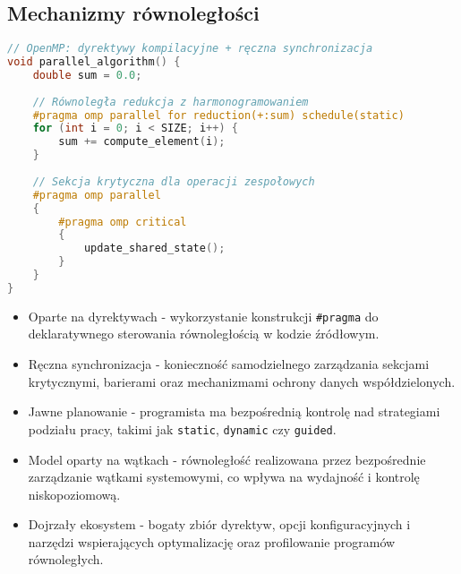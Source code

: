 \subsection{Mechanizmy równoległości}
\begin{lstlisting}[language=C++, style=VS2017,  caption={Mechanizmy równoległości w benchmarkach C++ z OpenMP}, label={lst:openmp_parallelism}]
// OpenMP: dyrektywy kompilacyjne + ręczna synchronizacja  
void parallel_algorithm() {
    double sum = 0.0;
    
    // Równoległa redukcja z harmonogramowaniem
    #pragma omp parallel for reduction(+:sum) schedule(static)
    for (int i = 0; i < SIZE; i++) {
        sum += compute_element(i);
    }
    
    // Sekcja krytyczna dla operacji zespołowych
    #pragma omp parallel
    {
        #pragma omp critical
        {
            update_shared_state();
        }
    }
}
\end{lstlisting}
\begin{itemize}
    \item Oparte na dyrektywach - wykorzystanie konstrukcji \texttt{\#pragma} do deklaratywnego sterowania równoległością w kodzie źródłowym.
    
    \item Ręczna synchronizacja - konieczność samodzielnego zarządzania sekcjami krytycznymi, barierami oraz mechanizmami ochrony danych współdzielonych.
    
    \item Jawne planowanie - programista ma bezpośrednią kontrolę nad strategiami podziału pracy, takimi jak \texttt{static}, \texttt{dynamic} czy \texttt{guided}.
    
    \item Model oparty na wątkach - równoległość realizowana przez bezpośrednie zarządzanie wątkami systemowymi, co wpływa na wydajność i kontrolę niskopoziomową.
    
    \item Dojrzały ekosystem - bogaty zbiór dyrektyw, opcji konfiguracyjnych i narzędzi wspierających optymalizację oraz profilowanie programów równoległych.
\end{itemize}
  
